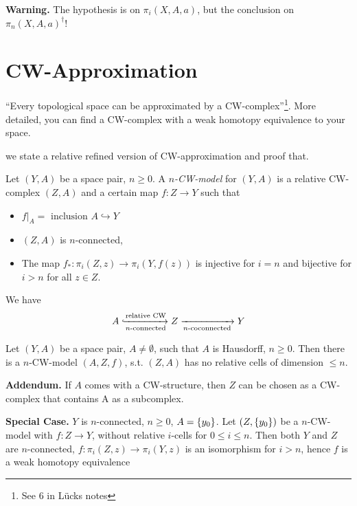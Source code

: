 \documentclass[language=english]{TemplateLecture}
\begin{document}
\textbf{Warning.} The hypothesis is on \(\pi_i(X,A,a)\), but the conclusion on \(\pi_n(X,A,a)^\dagger\)!


\section{CW-Approximation}

\enquote{Every topological space can be approximated by a CW-complex}\footnote{See 6 in Lücks notes}. More detailed, you can find a CW-complex with a weak homotopy equivalence to your space.

we state a relative refined version of CW-approximation and proof that.

\begin{defi}{}{}
    Let \((Y,A)\) be a space pair, \(n\geq 0\). A \emph{\(n\)-CW-model} for \((Y,A)\) is a relative CW-complex \((Z,A)\) and a certain map \(f\colon Z\to Y\) such that
    \begin{itemize}
        \item \(f\rvert_{A} = \text{ inclusion } A\hookrightarrow Y\)
        \item \((Z,A)\) is \(n\)-connected,
        \item The map \(f_*\colon \pi_i(Z,z)\to \pi_i(Y,f(z))\) is injective for \(i = n\) and bijective for \(i> n\) for all \(z \in Z\).
    \end{itemize}
\end{defi}

We have
\[A\xhookrightarrow[n\text{-connected}]{\text{relative CW}} Z \xrightarrow[n\text{-coconnected}]{} Y\]

\begin{thm}{}{}
    Let \((Y,A)\) be a space pair, \(A\neq \emptyset\), such that \(A\) is Hausdorff, \(n\geq 0\). Then there is a \(n\)-CW-model \((A,Z,f)\), s.t. \((Z,A)\) has no relative cells of dimension \(\leq n\).
\end{thm}

\textbf{Addendum.} If \(A\) comes with a CW-structure, then \(Z\) can be chosen as a CW-complex that contains A as a subcomplex.

\textbf{Special Case.} \(Y\) is \(n\)-connected, \(n\geq 0\), \(A = \{y_0\}\). Let \((Z,\{y_0\})\) be a \(n\)-CW-model with \(f\colon Z\to Y\), without relative \(i\)-cells for \(0\leq i\leq n\). Then both \(Y\) and \(Z\) are \(n\)-connected, \(f\colon \pi_i(Z,z)\to \pi_i(Y, z)\) is an isomorphism for \(i>n\), hence \(f\) is a weak homotopy equivalence
\end{document}

